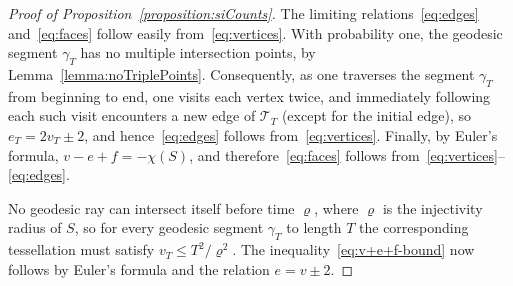 \documentclass[AHL, Unicode, longabstracts, published]{cedram}
\begin{document}
\begin{proof}[Proof of Proposition~\ref{proposition:siCounts}]
The limiting relations~\eqref{eq:edges} and~\eqref{eq:faces} follow easily from~\eqref{eq:vertices}. With probability one, the geodesic segment $\gamma_{T}$ has no multiple intersection points, by Lemma~\ref{lemma:noTriplePoints}. Consequently, as one traverses the segment $\gamma_{T}$ from beginning to end, one visits each vertex twice, and immediately following each such visit encounters a new edge of $\mathcal{T}_{T}$ (except for the initial edge), so $e_{T}=2v_{T}\pm 2$, and hence~\eqref{eq:edges} follows from~\eqref{eq:vertices}. Finally, by Euler's formula, $v-e+f=-\chi (S)$, and therefore~\eqref{eq:faces} follows from~\eqref{eq:vertices}--\eqref{eq:edges}.


No geodesic ray can intersect itself before time $\varrho $, where $\varrho $ is the injectivity radius of $S$, so for every geodesic segment $\gamma_{T}$ to length $T$ the corresponding tessellation must satisfy $v_{T}\leq T^{2}/ \varrho^{2}$. The inequality~\eqref{eq:v+e+f-bound} now follows by Euler's formula and the relation $e=v\pm 2$.
\end{proof}
\end{document}

